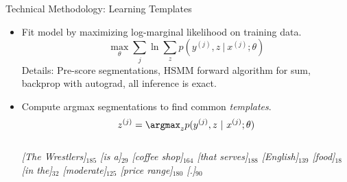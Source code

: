 \begin{frame}{Technical Methodology:  Learning Templates}

  \begin{itemize}
  \item Fit model by maximizing log-marginal likelihood on training data.
    \[ \max_\theta \sum_{j} \ln \sum_z p(y^{(j)}, z \ |\ x^{(j)}; \theta)\]
    \air
  Details: Pre-score segmentations, HSMM forward algorithm for sum, backprop with autograd, all inference is exact.
    \air

    \pause

  \item Compute argmax segmentations to find common \textit{templates}.
    \[ z^{(j)} = \argmax_z p(y^{(j)}, z \ |\ x^{(j)}; \theta)\]
    \\

    {\it
    [The Wrestlers]$_{185}$ [is a]$_{29}$ [coffee shop]$_{164}$ [that serves]$_{188}$ [English]$_{139}$ [food]$_{18}$ [in the]$_{32}$ [moderate]$_{125}$ [price range]$_{180}$ [.]$_{90}$
  }
  \end{itemize}

\end{frame}


